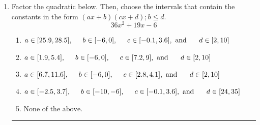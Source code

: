 \documentclass[14pt]{extbook}
\newcommand{\litem}[1]{\item#1\hspace*{-1cm}\rule{\textwidth}{0.4pt}}
\begin{document}
\begin{enumerate}
{\begin{enumerate}[label=\Alph*.]
\end{enumerate} }
\litem{
Factor the quadratic below. Then, choose the intervals that contain the constants in the form $(ax+b)(cx+d); b \leq d.$\[ 36x^{2} +19 x -6 \]\begin{enumerate}[label=\Alph*.]
\item \( a \in [25.9, 28.5], \hspace*{5mm} b \in [-6, 0], \hspace*{5mm} c \in [-0.1, 3.6], \text{ and } \hspace*{5mm} d \in [2, 10] \)
\item \( a \in [1.9, 5.4], \hspace*{5mm} b \in [-6, 0], \hspace*{5mm} c \in [7.2, 9], \text{ and } \hspace*{5mm} d \in [2, 10] \)
\item \( a \in [6.7, 11.6], \hspace*{5mm} b \in [-6, 0], \hspace*{5mm} c \in [2.8, 4.1], \text{ and } \hspace*{5mm} d \in [2, 10] \)
\item \( a \in [-2.5, 3.7], \hspace*{5mm} b \in [-10, -6], \hspace*{5mm} c \in [-0.1, 3.6], \text{ and } \hspace*{5mm} d \in [24, 35] \)
\item \( \text{None of the above.} \)


\end{enumerate}}
\end{enumerate}
\end{document}
